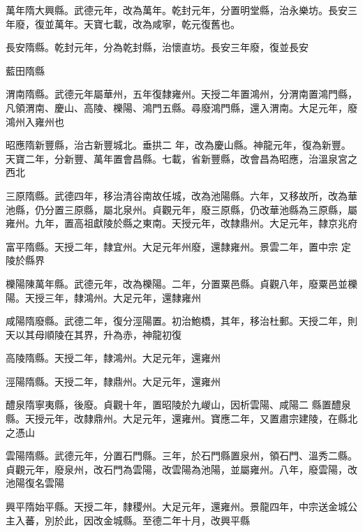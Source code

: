 \begin{pinyinscope}
 萬年隋大興縣。武德元年，改為萬年。乾封元年，分置明堂縣，治永樂坊。長安三年廢，復並萬年。天寶七載，改為咸寧，乾元復舊也。



 長安隋縣。乾封元年，分為乾封縣，治懷直坊。長安三年廢，復並長安



 藍田隋縣



 渭南隋縣。武德元年屬華州，五年復隸雍州。天授二年置鴻州，分渭南置鴻門縣，凡領渭南、慶山、高陵、櫟陽、鴻門五縣。尋廢鴻門縣，還入渭南。大足元年，廢鴻州入雍州也



 昭應隋新豐縣，治古新豐城北。垂拱二
 年，改為慶山縣。神龍元年，復為新豐。天寶二年，分新豐、萬年置會昌縣。七載，省新豐縣，改會昌為昭應，治溫泉宮之西北



 三原隋縣。武德四年，移治清谷南故任城，改為池陽縣。六年，又移故所，改為華池縣，仍分置三原縣，屬北泉州。貞觀元年，廢三原縣，仍改華池縣為三原縣，屬雍州。九年，置高祖獻陵於縣之東南。天授元年，改隸鼎州。大足元年，隸京兆府



 富平隋縣。天授二年，隸宜州。大足元年州廢，還隸雍州。景雲二年，置中宗
 定陵於縣界



 櫟陽陳萬年縣。武德元年，改為櫟陽。二年，分置粟邑縣。貞觀八年，廢粟邑並櫟陽。天授三年，隸鴻州。大足元年，還隸雍州



 咸陽隋廢縣。武德二年，復分涇陽置。初治鮑橋，其年，移治杜郵。天授二年，則天以其母順陵在其界，升為赤，神龍初復



 高陵隋縣。天授二年，隸鴻州。大足元年，還雍州



 涇陽隋縣。天授二年，隸鼎州。大足元年，還雍州



 醴泉隋寧夷縣，後廢。貞觀十年，置昭陵於九嵕山，因析雲陽、咸陽二
 縣置醴泉縣。天授元年，改隸鼎州。大足元年，還雍州。寶應二年，又置肅宗建陵，在縣北之憑山



 雲陽隋縣。武德元年，分置石門縣。三年，於石門縣置泉州，領石門、溫秀二縣。貞觀元年，廢泉州，改石門為雲陽，改雲陽為池陽，並屬雍州。八年，廢雲陽，改池陽復名雲陽



 興平隋始平縣。天授二年，隸稷州。大足元年，還雍州。景龍四年，中宗送金城公主入蕃，別於此，因改金城縣。至德二年十月，改興平縣




\end{pinyinscope}
